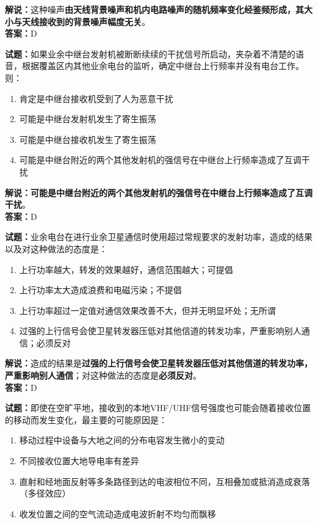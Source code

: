 \documentclass{ctexbook}
\begin{document}
\noindent\textbf{解说：}这种噪声\textbf{由天线背景噪声和机内电路噪声的随机频率变化经鉴频形成，其大小与天线接收到的背景噪声幅度无关}。\\\noindent\textbf{答案：}D%

\bigskip


\noindent\textbf{试题：}如果业余中继台发射机被断断续续的干扰信号所启动，夹杂着不清楚的语音，根据覆盖区内其他业余电台的监听，确定中继台上行频率并没有电台工作。则：

\begin{enumerate}[leftmargin=3em]
	\item 肯定是中继台接收机受到了人为恶意干扰
	\item 可能是中继台发射机发生了寄生振荡
	\item 可能是中继台接收机发生了寄生振荡
	\item 可能是中继台附近的两个其他发射机的强信号在中继台上行频率造成了互调干扰
\end{enumerate}

\noindent\textbf{解说：可能是中继台附近的两个其他发射机的强信号在中继台上行频率造成了互调干扰}。\\\noindent\textbf{答案：}D%


\bigskip


\noindent\textbf{试题：}业余电台在进行业余卫星通信时使用超过常规要求的发射功率，造成的结果以及对这种做法的态度是：

\begin{enumerate}[leftmargin=3em]
	\item 上行功率越大，转发的效果越好，通信范围越大；可提倡
	\item 上行功率太大造成浪费和电磁污染；不提倡
	\item 上行功率超过一定值对通信效果改善不大，但并无明显坏处；无所谓
	\item 过强的上行信号会使卫星转发器压低对其他信道的转发功率，严重影响别人通信；必须反对
\end{enumerate}

\noindent\textbf{解说：}造成的结果是\textbf{过强的上行信号会使卫星转发器压低对其他信道的转发功率，严重影响别人通信}；对这种做法的态度是\textbf{必须反对}。\\\noindent\textbf{答案：}D%

\bigskip


\noindent\textbf{试题：}即使在空旷平地，接收到的本地VHF/UHF信号强度也可能会随着接收位置的移动而发生变化，最主要的可能原因是：

\begin{enumerate}[leftmargin=3em]
	\item 移动过程中设备与大地之间的分布电容发生微小的变动
	\item 不同接收位置大地导电率有差异
	\item 直射和经地面反射等多条路径到达的电波相位不同，互相叠加或抵消造成衰落（多径效应）
	\item 收发位置之间的空气流动造成电波折射不均匀而飘移
\end{enumerate}
\end{document}
